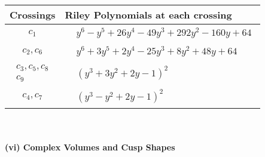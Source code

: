 \documentclass[1p]{elsarticle_modified}
\theoremstyle{definition}
\begin{document}
\begin{tabular}{m{50pt}|m{274pt}}
Crossings & \hspace{64pt}Riley Polynomials at each crossing \\
\hline $$\begin{aligned}c_{1}\end{aligned}$$&$\begin{aligned}
&y^6- y^5+26 y^4-49 y^3+292 y^2-160 y+64
\end{aligned}$\\
\hline $$\begin{aligned}c_{2},c_{6}\end{aligned}$$&$\begin{aligned}
&y^6+3 y^5+2 y^4-25 y^3+8 y^2+48 y+64
\end{aligned}$\\
\hline $$\begin{aligned}c_{3},c_{5},c_{8}\\c_{9}\end{aligned}$$&$\begin{aligned}
&(y^3+3 y^2+2 y-1)^2
\end{aligned}$\\
\hline $$\begin{aligned}c_{4},c_{7}\end{aligned}$$&$\begin{aligned}
&(y^3- y^2+2 y-1)^2
\end{aligned}$\\
\hline
\end{tabular}\\~\\
\newpage\flushleft \textbf{(vi) Complex Volumes and Cusp Shapes}
\end{document}
